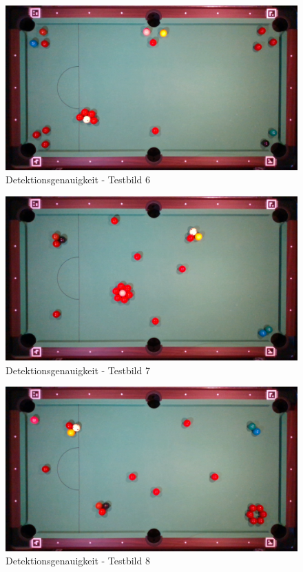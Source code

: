 \begin{figure}[h!]
    \begin{center}
        \includegraphics[width=0.8\linewidth]{../common/07_appendix/resources/00_detection/05_detektion_testbild_6.png}
    \end{center}
    \caption{Detektionsgenauigkeit - Testbild 6}
    \label{fig:detektionsgenauigkeit:testbild:6}
\end{figure}
\begin{figure}[h!]
    \begin{center}
        \includegraphics[width=0.8\linewidth]{../common/07_appendix/resources/00_detection/06_detektion_testbild_7.png}
    \end{center}
    \caption{Detektionsgenauigkeit - Testbild 7}
    \label{fig:detektionsgenauigkeit:testbild:7}
\end{figure}
\begin{figure}[h!]
    \begin{center}
        \includegraphics[width=0.8\linewidth]{../common/07_appendix/resources/00_detection/07_detektion_testbild_8.png}
    \end{center}
    \caption{Detektionsgenauigkeit - Testbild 8}
    \label{fig:detektionsgenauigkeit:testbild:8}
\end{figure}

